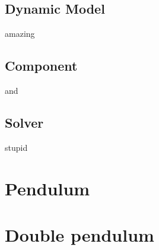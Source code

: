 \documentclass[10pt]{article}
\begin{document}
\subsection*{Dynamic Model}
amazing
\subsection*{Component}
and
\subsection*{Solver}
stupid

\section*{Pendulum}

\section*{Double pendulum}
\end{document}
